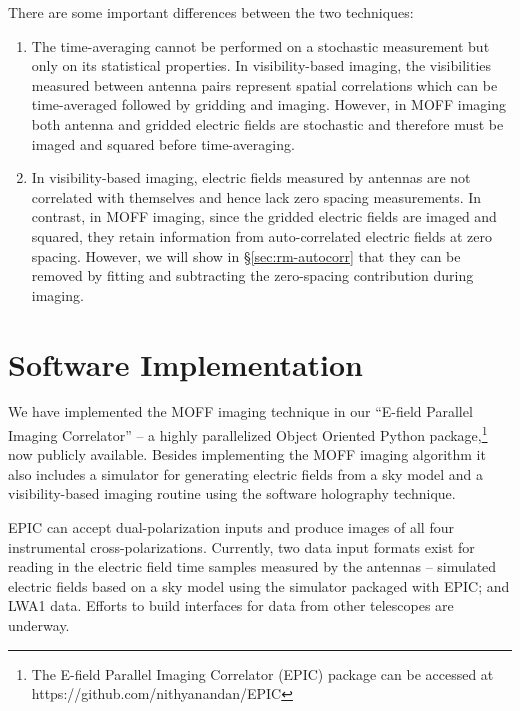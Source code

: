 \documentclass[a4paper,fleqn,usenatbib]{mnras}
\begin{document}
There are some important differences between the two techniques:
\begin{enumerate}
\item The time-averaging cannot be performed on a stochastic measurement but only on its statistical properties. In visibility-based imaging, the visibilities measured between antenna pairs represent spatial correlations which can be time-averaged followed by gridding and imaging. However, in MOFF imaging both antenna and gridded electric fields are stochastic and therefore must be imaged and squared before time-averaging. 
\item In visibility-based imaging, electric fields measured by antennas are not correlated with themselves and hence lack zero spacing measurements. In contrast, in MOFF imaging, since the gridded electric fields are imaged and squared, they retain information from auto-correlated electric fields at zero spacing. However, we will show in \S\ref{sec:rm-autocorr} that they can be removed by fitting and subtracting the zero-spacing contribution during imaging.
\end{enumerate} 

\section{Software Implementation}\label{sec:software}

We have implemented the MOFF imaging technique in our ``E-field Parallel Imaging Correlator'' -- a highly parallelized Object Oriented Python package,\footnote{The E-field Parallel Imaging Correlator (EPIC) package can be accessed at https://github.com/nithyanandan/EPIC} now publicly available. Besides implementing the MOFF imaging algorithm it also includes a simulator for generating electric fields from a sky model and a visibility-based imaging routine using the software holography technique.

EPIC can accept dual-polarization inputs and produce images of all four instrumental cross-polarizations. Currently, two data input formats exist for reading in the electric field time samples measured by the antennas -- simulated electric fields based on a sky model using the simulator packaged with EPIC; and LWA1 data. Efforts to build interfaces for data from other telescopes are underway.
\end{document}
